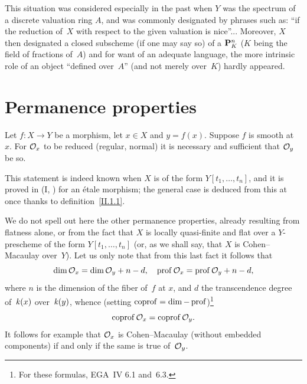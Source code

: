 This situation was considered especially in the past
when $Y$ was the spectrum of a discrete valuation ring
$A$, and was commonly designated by phrases
such as: ``if the reduction of~$X$ with respect to the given
valuation is nice''... Moreover, $X$ then designated a
closed subscheme (if one may say so) of a $\PP_{K}^{n}$ ($K$
being the field of fractions of~$A$) and for want of an
adequate language, the more intrinsic role of an object ``defined
over~$A$'' (and not merely over~$K$) hardly appeared.

\section{Permanence properties}
\label{II.3}

\begin{proposition}
\label{II.3.1}
Let $f\colon X\to Y$ be a morphism, let $x\in X$ and
$y=f(x)$. Suppose $f$ is smooth at~$x$. For $\cal{O}_{x}$ to be
reduced (\resp regular, \resp normal) it is necessary and sufficient that
$\cal{O}_{y}$ be so.
\end{proposition}

This statement is indeed known when $X$ is of the form
$Y[t_{1},\dots,t_{n}]$, and it is proved in (I, \no {})
for an \'etale morphism; the general case is deduced from this
at once thanks to definition~\ref{II.1.1}.

We do not spell out here the other permanence
properties, already resulting from flatness alone, or from
the fact that $X$ is locally quasi-finite and flat over a
$Y$-prescheme of the form $Y[t_{1},\dots,t_{n}]$ (or, as
we shall say, that $X$ is
Cohen--Macaulay
over~$Y$). Let us only note that from this last fact
it follows that
\begin{equation}
\label{eq:II.3.1}
{\dim\cal{O}_{x}=\dim\cal{O}_{y}+n-d,\quad
\prof\cal{O}_{x}=\prof\cal{O}_{y}+n-d},
\end{equation}
where $n$ is the dimension of the fiber of~$f$ at $x$, and $d$ the
transcendence degree of~$\kres(x)$ over~$\kres(y)$, whence (setting
$\coprof=\dim-\prof$)\footnote{For these formulas, \cf EGA~IV 6.1
and~6.3.}
\begin{equation}
\label{eq:II.3.2}
{\coprof\cal{O}_{x}=\coprof\cal{O}_{y}}.
\end{equation}
It follows for example that $\cal{O}_{x}$ is Cohen--Macaulay
(\resp without embedded components) if and only if the same is
true of~$\cal{O}_{y}$.
